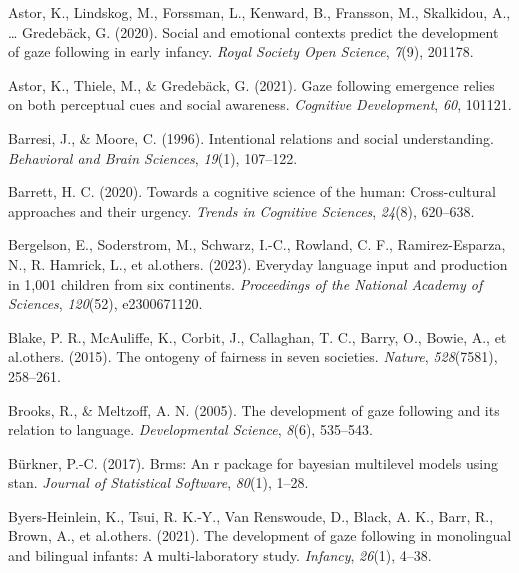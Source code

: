 \documentclass[
  man,floatsintext]{apa6}
\newlength{\cslhangindent}
\newlength{\cslentryspacingunit} %
\newenvironment{CSLReferences}[2] %
 {%
  \setlength{\parindent}{0pt}
  \ifodd #1
  \let\oldpar\par
  \def\par{\hangindent=\cslhangindent\oldpar}
  \fi
  \setlength{\parskip}{#2\cslentryspacingunit}
 }%
 {}
\begin{document}
\hypertarget{refs}{}
\begin{CSLReferences}{1}{0}
\leavevmode{}%
Astor, K., Lindskog, M., Forssman, L., Kenward, B., Fransson, M., Skalkidou, A., \ldots{} Gredebäck, G. (2020). Social and emotional contexts predict the development of gaze following in early infancy. \emph{Royal Society Open Science}, \emph{7}(9), 201178.

\leavevmode{}%
Astor, K., Thiele, M., \& Gredebäck, G. (2021). Gaze following emergence relies on both perceptual cues and social awareness. \emph{Cognitive Development}, \emph{60}, 101121.

\leavevmode{}%
Barresi, J., \& Moore, C. (1996). Intentional relations and social understanding. \emph{Behavioral and Brain Sciences}, \emph{19}(1), 107--122.

\leavevmode{}%
Barrett, H. C. (2020). Towards a cognitive science of the human: Cross-cultural approaches and their urgency. \emph{Trends in Cognitive Sciences}, \emph{24}(8), 620--638.

\leavevmode{}%
Bergelson, E., Soderstrom, M., Schwarz, I.-C., Rowland, C. F., Ramirez-Esparza, N., R. Hamrick, L., et al.others. (2023). Everyday language input and production in 1,001 children from six continents. \emph{Proceedings of the National Academy of Sciences}, \emph{120}(52), e2300671120.

\leavevmode{}%
Blake, P. R., McAuliffe, K., Corbit, J., Callaghan, T. C., Barry, O., Bowie, A., et al.others. (2015). The ontogeny of fairness in seven societies. \emph{Nature}, \emph{528}(7581), 258--261.

\leavevmode{}%
Brooks, R., \& Meltzoff, A. N. (2005). The development of gaze following and its relation to language. \emph{Developmental Science}, \emph{8}(6), 535--543.

\leavevmode{}%
Bürkner, P.-C. (2017). Brms: An r package for bayesian multilevel models using stan. \emph{Journal of Statistical Software}, \emph{80}(1), 1--28.

\leavevmode{}%
Byers-Heinlein, K., Tsui, R. K.-Y., Van Renswoude, D., Black, A. K., Barr, R., Brown, A., et al.others. (2021). The development of gaze following in monolingual and bilingual infants: A multi-laboratory study. \emph{Infancy}, \emph{26}(1), 4--38.


\end{CSLReferences}
\end{document}
